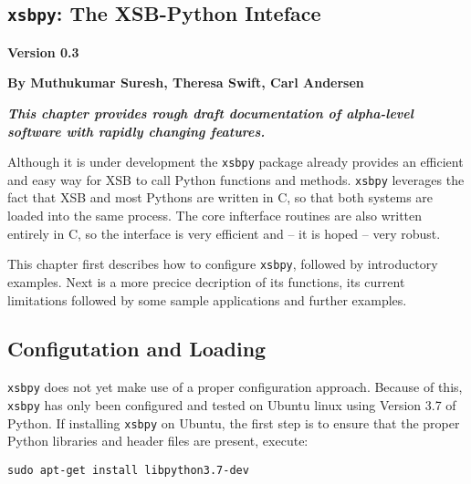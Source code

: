 \newcommand{\xsbpyversion}{Version 0.3}

\begin{center}
\chapter[XSB and Python]{{\tt xsbpy}: The XSB-Python Inteface} \label{chap:xsbpy}
\end{center}

\vspace*{-.30in} 
\begin{center}
{\Large {\bf  \xsbpyversion}}
\end{center}

\begin{center}
  {\Large {\bf By Muthukumar Suresh, Theresa Swift, Carl Andersen}}
\end{center}

\noindent
{\large {\bf {\em This chapter provides rough draft documentation of
      alpha-level software with rapidly changing features.}}}

%

Although it is under development the {\tt xsbpy} package already
provides an efficient and easy way for XSB to call Python functions
and methods.  {\tt xsbpy} leverages the fact that XSB and most Pythons
are written in C, so that both systems are loaded into the same
process. The core infterface routines are also written entirely in C,
so the interface is very efficient and -- it is hoped -- very robust.

This chapter first describes how to configure {\tt xsbpy}, followed by
introductory examples.  Next is a more precice decription of its
functions, its current limitations followed by some sample
applications and further examples.

\section{Configutation and Loading}

{\tt xsbpy} does not yet make use of a proper configuration approach.
Because of this, {\tt xsbpy} has only been configured and tested on
Ubuntu linux using Version 3.7 of Python.  If installing {\tt xsbpy}
on Ubuntu, the first step is to ensure that the proper Python
libraries and header files are present, execute:

{\tt sudo apt-get install libpython3.7-dev}



